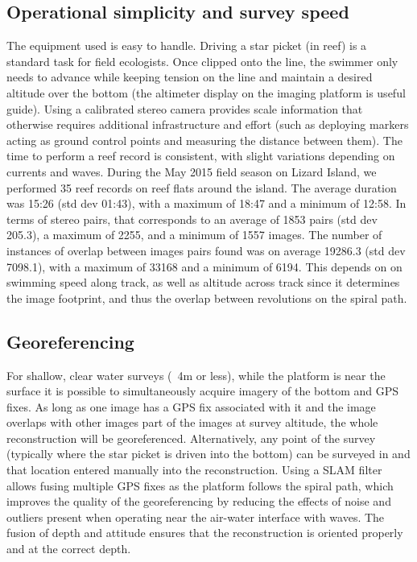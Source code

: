 \subsection{Operational simplicity and survey speed}
The equipment used is easy to handle. Driving a star picket (in reef) is a standard task for field ecologists. Once clipped onto the line, the swimmer only needs to advance while keeping tension on the line and maintain a desired altitude over the bottom (the altimeter display on the imaging platform is useful guide).
Using a calibrated stereo camera provides scale information that otherwise requires additional infrastructure and effort (such as deploying markers acting as ground control points and measuring the distance between them). 
The time to perform a reef record is consistent, with slight variations depending on currents and waves. During the May 2015 field season on Lizard Island, we performed 35 reef records on reef flats around the island. The average duration was 15:26 (std dev 01:43), with a maximum of 18:47 and a minimum of 12:58. In terms of stereo pairs, that corresponds to an average of 1853 pairs (std dev 205.3), a maximum of 2255, and a minimum of 1557 images. The number of instances of overlap between images pairs found was on average 19286.3 (std dev 7098.1), with a maximum of 33168 and a minimum of 6194. This depends on on swimming speed along track, as well as altitude across track since it determines the image footprint, and thus the overlap between revolutions on the spiral path.


\subsection{Georeferencing}
For shallow, clear water surveys (~4m or less), while the platform is near the surface it is possible to simultaneously acquire imagery of the bottom and GPS fixes. As long as one image has a GPS fix associated with it and the image overlaps with other images part of the images at survey altitude, the whole reconstruction will be georeferenced. Alternatively, any point of the survey (typically where the star picket is driven into the bottom) can be surveyed in and that location entered manually into the reconstruction. Using a SLAM filter allows fusing multiple GPS fixes as the platform follows the spiral path, which improves the quality of the georeferencing by reducing the effects of noise and outliers present when operating near the air-water interface with waves.
The fusion of depth and attitude ensures that the reconstruction is oriented properly and at the correct depth.

